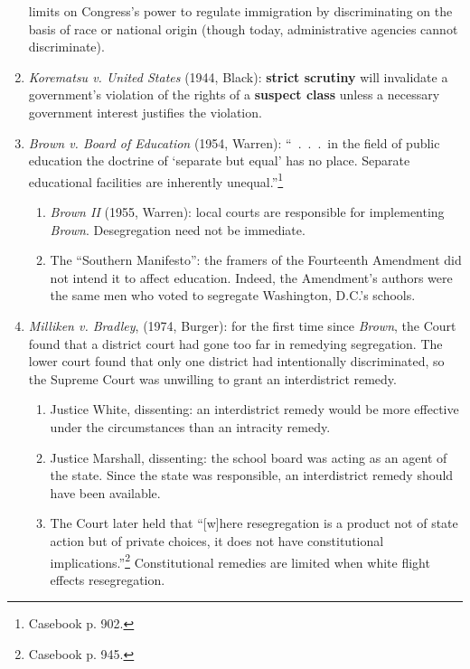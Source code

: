 \begin{enumerate}
    limits on Congress's power to regulate immigration by discriminating on 
    the basis of race or national origin (though today, administrative 
    agencies cannot discriminate).
    \item \emph{Korematsu v. United States} (1944, Black): \textbf{strict 
    scrutiny} will invalidate a government's violation of the rights of a 
    \textbf{suspect class} unless a necessary government interest justifies 
    the violation.
    \item \emph{Brown v. Board of Education} (1954, Warren): ``~.~.~.~in the 
    field of public education the doctrine of `separate but equal' has no 
    place. Separate educational facilities are inherently 
    unequal.''\footnote{Casebook p. 902.}
    \begin{enumerate}
        \item \emph{Brown II} (1955, Warren): local courts are responsible for 
        implementing \emph{Brown}. Desegregation need not be immediate.
        \item The ``Southern Manifesto'': the framers of the Fourteenth 
        Amendment did not intend it to affect education. Indeed, the 
        Amendment's authors were the same men who voted to segregate 
        Washington, D.C.'s schools.
    \end{enumerate}
    \item \emph{Milliken v. Bradley}, (1974, Burger): for the first time since 
    \emph{Brown}, the Court found that a district court had gone too far in 
    remedying segregation. The lower court found that only one district had 
    intentionally discriminated, so the Supreme Court was unwilling to grant 
    an interdistrict remedy.
    \begin{enumerate}
        \item Justice White, dissenting: an interdistrict remedy would be more 
        effective under the circumstances than an intracity remedy.
        \item Justice Marshall, dissenting: the school board was acting as an 
        agent of the state. Since the state was responsible, an interdistrict 
        remedy should have been available.
        \item The Court later held that ``[w]here resegregation is a product 
        not of state action but of private choices, it does not have 
        constitutional implications.''\footnote{Casebook p. 945.} 
        Constitutional remedies are limited when white flight effects 
        resegregation.
    \end{enumerate}

\end{enumerate}
